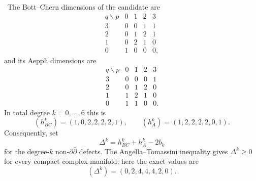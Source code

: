 \begin{theorem}
\label{thm:exact-bott-chern-aeppli}
\Verified\ The Bott--Chern dimensions of the candidate are
\[
\begin{array}{c|cccc}
q\backslash p&0&1&2&3\\ \hline
3&0&0&1&1\\
2&0&1&2&1\\
1&0&2&1&0\\
0&1&0&0&0,
\end{array}
\tag{11.21}
\]
and its Aeppli dimensions are
\[
\begin{array}{c|cccc}
q\backslash p&0&1&2&3\\ \hline
3&0&0&0&1\\
2&0&1&2&0\\
1&1&2&1&0\\
0&1&1&0&0.
\end{array}
\tag{11.22}
\]
In total degree $k=0,\ldots,6$ this is
\[
 (h^k_{BC})=(1,0,2,2,2,2,1),\qquad
 (h^k_A)=(1,2,2,2,2,0,1).
\tag{11.23}
\]
Consequently, set
\[
 \Delta^k=h^k_{BC}+h^k_A-2b_k
\]
for the degree-$k$ non-$\partial\bar\partial$ defects.  The
Angella--Tomassini inequality
\cite[Theorem~A]{AngellaTomassini2013} gives $\Delta^k\ge0$ for every compact
complex manifold; here the exact values are
\[
 (\Delta^k)=(0,2,4,4,4,2,0).
\tag{11.24}
\]
\end{theorem}

